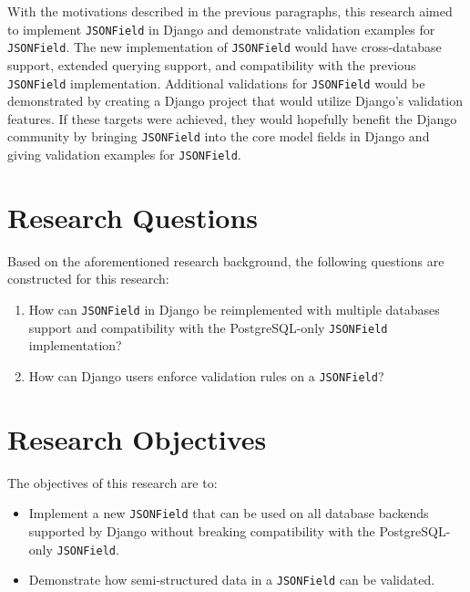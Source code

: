 With the motivations described in the previous paragraphs, this research aimed
to implement \verb|JSONField| in Django and demonstrate validation examples for
\verb|JSONField|. The new implementation of \verb|JSONField| would have
cross-database support, extended querying support, and compatibility with the
previous \verb|JSONField| implementation. Additional validations for
\verb|JSONField| would be demonstrated by creating a Django project that would
utilize Django's validation features. If these targets were achieved, they
would hopefully benefit the Django community by bringing \verb|JSONField| into
the core model fields in Django and giving validation examples for
\verb|JSONField|.

\section{Research Questions}

Based on the aforementioned research background, the following questions are
constructed for this research:

\begin{enumerate}
    \item How can \verb|JSONField| in Django be reimplemented with multiple
          databases support and compatibility with the PostgreSQL-only
          \verb|JSONField| implementation?
    \item How can Django users enforce validation rules on a \verb|JSONField|?
\end{enumerate}

\section{Research Objectives}

The objectives of this research are to:

\begin{itemize}
    \item Implement a new \verb|JSONField| that can be used on all database
          backends supported by Django without breaking compatibility with the
          PostgreSQL-only \verb|JSONField|.
    \item Demonstrate how semi-structured data in a \verb|JSONField| can be
          validated.
\end{itemize}

